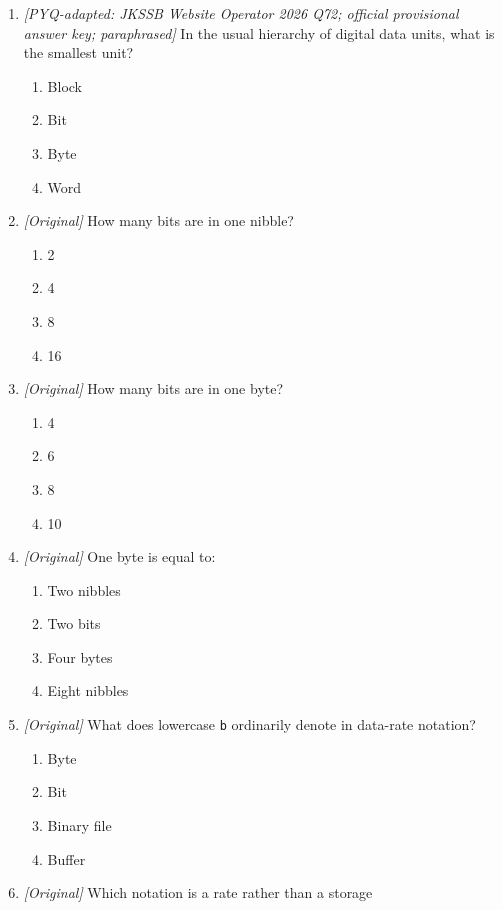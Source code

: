 \begin{enumerate}[label=\textbf{Q\arabic*.}, leftmargin=*]
\item \textit{[PYQ-adapted: JKSSB Website Operator 2026 Q72; official
provisional answer key; paraphrased]} In the usual hierarchy of digital data
units, what is the smallest unit?
  \begin{enumerate}[label=\Alph*.]
    \item Block
    \item Bit
    \item Byte
    \item Word
  \end{enumerate}
\item \textit{[Original]} How many bits are in one nibble?
  \begin{enumerate}[label=\Alph*.]
    \item 2
    \item 4
    \item 8
    \item 16
  \end{enumerate}
\item \textit{[Original]} How many bits are in one byte?
  \begin{enumerate}[label=\Alph*.]
    \item 4
    \item 6
    \item 8
    \item 10
  \end{enumerate}
\item \textit{[Original]} One byte is equal to:
  \begin{enumerate}[label=\Alph*.]
    \item Two nibbles
    \item Two bits
    \item Four bytes
    \item Eight nibbles
  \end{enumerate}
\item \textit{[Original]} What does lowercase \texttt{b} ordinarily denote in
  data-rate notation?
  \begin{enumerate}[label=\Alph*.]
    \item Byte
    \item Bit
    \item Binary file
    \item Buffer
  \end{enumerate}
\item \textit{[Original]} Which notation is a rate rather than a storage

\end{enumerate}
